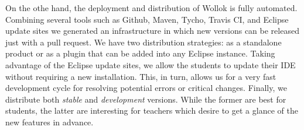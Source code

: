 On the othe hand, the deployment and distribution of Wollok is fully automated.
Combining several tools such as Github, Maven, Tycho, Travis CI, and Eclipse update sites we generated an infrastructure in which new versions can be released just with a pull request.
We have two distribution strategies: as a standalone product or as a plugin that can be added into any Eclipse instance.
Taking advantage of the Eclipse update sites, we allow the students to update their IDE without requiring a new installation.
This, in turn, allows us for a very fast development cycle for resolving potential errors or critical changes.
Finally, we distribute both \emph{stable} and \emph{development} versions. 
While the former are best for students, the latter are interesting for teachers which desire to get a glance of the new features in advance.

